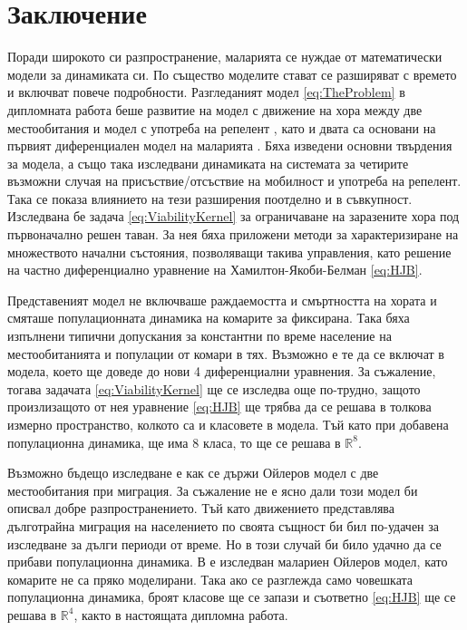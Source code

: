 \section{\hspace{1em} Заключение}
Поради широкото си разпространение, маларията се нуждае от математически модели за динамиката си.
По същество моделите стават се разширяват с времето и включват повече подробности.
Разгледаният модел \eqref{eq:TheProblem} в дипломната работа беше развитие на модел с движение на хора между две местообитания \cite{Bichara2016} и модел с употреба на репелент \cite{Rashkov2022}, като и двата са основани на първият диференциален модел на маларията \cite{Smith2012}.
Бяха изведени основни твърдения за модела, а също така изследвани динамиката на системата за четирите възможни случая на присъствие/отсъствие на мобилност и употреба на репелент.
Така се показа влиянието на тези разширения поотделно и в съвкупност.
Изследвана бе задача \eqref{eq:ViabilityKernel} за ограничаване на заразените хора под първоначално решен таван.
За нея бяха приложени методи \cite{Zidani2013} за характеризиране на множеството начални състояния, позволяващи такива управления, като решение на частно диференциално уравнение на Хамилтон-Якоби-Белман \eqref{eq:HJB}.

Представеният модел не включваше раждаемостта и смъртността на хората и смяташе популационната динамика на комарите за фиксирана.
Така бяха изпълнени типични допускания за константни по време население на местообитанията и популации от комари в тях.
Възможно е те да се включат в модела, което ще доведе до нови 4 диференциални уравнения.
За съжаление, тогава задачата \eqref{eq:ViabilityKernel} ще се изследва още по-трудно, защото произлизащото от нея уравнение \eqref{eq:HJB} ще трябва да се решава в толкова измерно пространство, колкото са и класовете в модела.
Тъй като при добавена популационна динамика, ще има 8 класа, то ще се решава в $\mathbb{R}^8$.

Възможно бъдещо изследване е как се държи Ойлеров модел с две местообитания при миграция.
За съжаление не е ясно дали този модел би описвал добре разпространението.
Тъй като движението представлява дълготрайна миграция на населението по своята същност би бил по-удачен за изследване за дълги периоди от време.
Но в този случай би било удачно да се прибави популационна динамика.
В \cite{Prosper2012} е изследван малариен Ойлеров модел, като комарите не са пряко моделирани.
Така ако се разглежда само човешката популационна динамика, броят класове ще се запази и съответно \eqref{eq:HJB} ще се решава в $\mathbb{R}^4$, както в настоящата дипломна работа.

